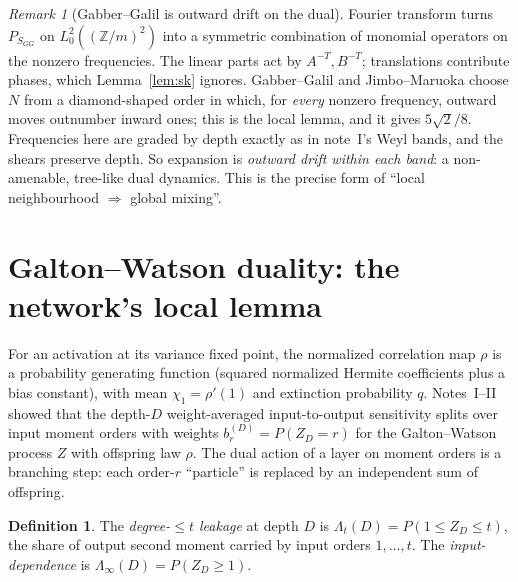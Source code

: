 \documentclass[11pt]{article}
\theoremstyle{definition}
\newtheorem{definition}[theorem]{Definition}
\theoremstyle{remark}
\newtheorem{remark}[theorem]{Remark}
\newcommand{\Z}{\mathbb Z}
\begin{document}
\begin{remark}[Gabber--Galil is outward drift on the dual]
Fourier transform turns $P_{S_{GG}}$ on $L^2_0((\Z/m)^2)$ into a symmetric combination of monomial operators on the nonzero frequencies. The linear parts act by $A^{-T},B^{-T}$; translations contribute phases, which Lemma~\ref{lem:sk} ignores. Gabber--Galil and Jimbo--Maruoka choose $N$ from a diamond-shaped order in which, for \emph{every} nonzero frequency, outward moves outnumber inward ones; this is the local lemma, and it gives $5\sqrt2/8$. Frequencies here are graded by depth exactly as in note~I's Weyl bands, and the shears preserve depth. So expansion is \emph{outward drift within each band}: a non-amenable, tree-like dual dynamics. This is the precise form of ``local neighbourhood $\Rightarrow$ global mixing''.
\end{remark}

\section{Galton--Watson duality: the network's local lemma}

For an activation at its variance fixed point, the normalized correlation map $\rho$ is a probability generating function (squared normalized Hermite coefficients plus a bias constant), with mean $\chi_1=\rho'(1)$ and extinction probability $q$. Notes~I--II showed that the depth-$D$ weight-averaged input-to-output sensitivity splits over input moment orders with weights $b^{(D)}_r=P(Z_D=r)$ for the Galton--Watson process $Z$ with offspring law $\rho$. The dual action of a layer on moment orders is a branching step: each order-$r$ ``particle'' is replaced by an independent sum of offspring.

\begin{definition}
The \emph{degree-$\le t$ leakage} at depth $D$ is $\Lambda_t(D)=P(1\le Z_D\le t)$, the share of output second moment carried by input orders $1,\dots,t$. The \emph{input-dependence} is $\Lambda_\infty(D)=P(Z_D\ge1)$.
\end{definition}
\end{document}
